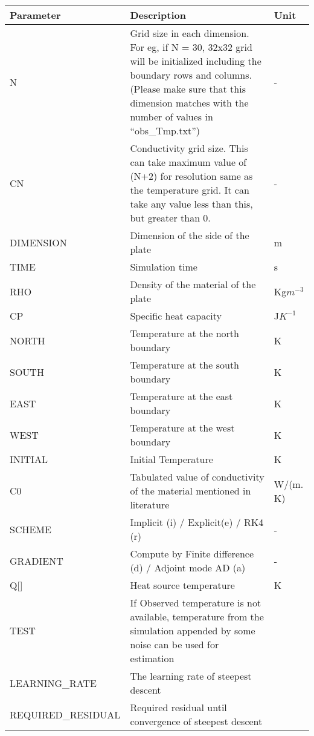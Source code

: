 \documentclass[10pt,a4paper]{report}
\begin{document}
\begin{appendices}
\begin{tabular}{ | m{10.5em} | m{7cm}| m{0.95cm} | } 
\hline
\textbf{Parameter} & \textbf{Description} & \textbf{Unit}\\ 
\hline
N& Grid size in each dimension. For eg, if N = 30, 32x32 grid will be initialized including the boundary rows and columns. (Please make sure that this dimension matches with the number of values in “obs\_Tmp.txt”) & - \\ 
\hline
CN & Conductivity grid size. This can take maximum value of (N+2) for resolution same as the temperature grid. It can take any value less than this, but greater than 0. & - \\ 
\hline
DIMENSION & Dimension of the side of the plate & m \\ 
\hline
TIME & Simulation time & s\\
\hline
RHO & Density of the material of the plate & Kg$m^{-3}$\\
\hline
CP & Specific heat capacity & J$K^{-1}$\\
\hline
NORTH & Temperature at the north boundary & K\\
\hline
SOUTH & Temperature at the south boundary & K\\
\hline
EAST & Temperature at the east boundary & K\\
\hline
WEST & Temperature at the west boundary & K\\
\hline
INITIAL & Initial Temperature & K\\
\hline
C0 & Tabulated value of conductivity of the material mentioned in literature & W/(m. K)\\
\hline
SCHEME & Implicit (i) / Explicit(e) / RK4 (r) & -\\
\hline
GRADIENT & Compute by Finite difference (d) / Adjoint mode AD (a) & -\\
\hline
Q[] & Heat source temperature & K\\
\hline
TEST & If Observed temperature is not available, temperature from the simulation appended by some noise can be used for estimation & \\
\hline
LEARNING\_RATE & The learning rate of steepest descent & \\
\hline
REQUIRED\_RESIDUAL & Required residual until convergence of steepest descent & \\
\hline
\end{tabular}\\

\vspace{0.3cm}


\end{appendices}
\end{document}
